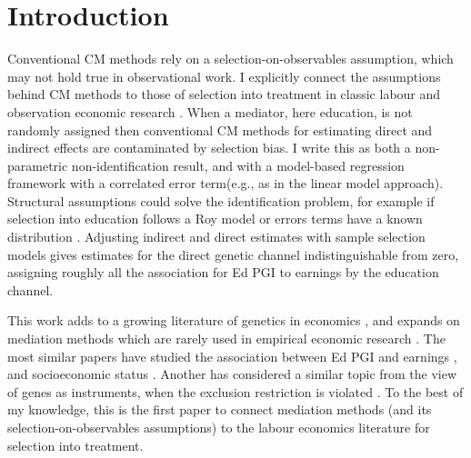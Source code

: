 \section{Introduction}
\label{sec:intro}


Conventional CM methods rely on a selection-on-observables assumption, which may not hold true in observational work.
I explicitly connect the assumptions behind CM methods to those of selection into treatment in classic labour and observation economic research \citep{heckman2005structural}.
When a mediator, here education, is not randomly assigned then conventional CM methods for estimating direct and indirect effects are contaminated by selection bias.
I write this as both a non-parametric non-identification result, and with a model-based regression framework with a correlated error term(e.g., as in the \citealt{imai2010identification} linear model approach).
Structural assumptions could solve the identification problem, for example if selection into education follows a Roy model or errors terms have a known distribution \citep{heckman1979sample}.
Adjusting indirect and direct estimates with sample selection models gives estimates for the direct genetic channel indistinguishable from zero, assigning roughly all the association for Ed PGI to earnings by the education channel.

This work adds to a growing literature of genetics in economics \citep{barth2020genetic}, and expands on mediation methods \citep{imai2010identification} which are rarely used in empirical economic research \citep{huber2020mediation}.
The most similar papers have studied the association between Ed PGI and earnings \citep{papageorge2020genes}, and socioeconomic status \citep{carvalho2024genetics}.
Another has considered a similar topic from the view of genes as instruments, when the exclusion restriction is violated \citep{spiller2019detecting,van2018pleiotropy}.
To the best of my knowledge, this is the first paper to connect mediation methods (and its selection-on-observables assumptions) to the labour economics literature for selection into treatment.

